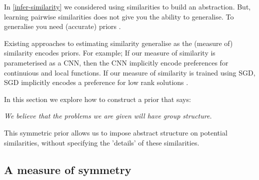 
In \ref{infer-similarity} we considered using similarities
to build an abstraction. But, learning pairwise similarities does not give
you the ability to generalise\footnotemark[38]. To generalise you need (accurate) priors \cite{Wolpert1996}.


Existing approaches to estimating similarity generalise as the (measure of) similarity encodes priors.
For example;
If our measure of similarity is parameterised as a CNN, then the CNN implicitly encode preferences for continuious and local functions\cite{Yann1995}.
If our measure of similarity is trained using SGD, SGD implicitly encodes a preference for low rank solutions \cite{Gunasekar2017}.

In this section we explore how to construct a prior that says:

\begin{displayquote}
	\textsl{We believe that the problems we are given will have group structure.}
\end{displayquote}

This symmetric prior allows us to impose abstract structure on potential similarities, without specifying
the 'details' of these similarities.

%
%
%


\subsection{A measure of symmetry}

